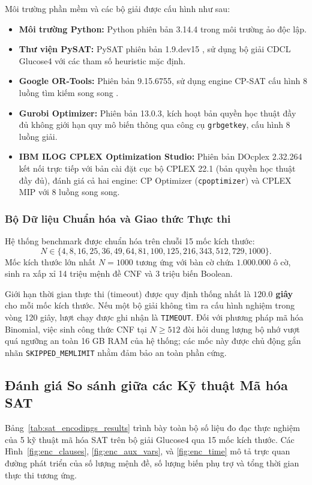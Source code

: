 \documentclass[a4paper,fleqn]{cas-sc}
\begin{document}
Môi trường phần mềm và các bộ giải được cấu hình như sau:
\begin{itemize}
    \item \textbf{Môi trường Python:} Python phiên bản 3.14.4 trong môi trường ảo độc lập.
    \item \textbf{Thư viện PySAT:} PySAT phiên bản 1.9.dev15 \cite{ignatiev2018pysat}, sử dụng bộ giải CDCL Glucose4 \cite{audemard2009predicting} với các tham số heuristic mặc định.
    \item \textbf{Google OR-Tools:} Phiên bản 9.15.6755, sử dụng engine CP-SAT cấu hình 8 luồng tìm kiếm song song \cite{perron2023ortools}.
    \item \textbf{Gurobi Optimizer:} Phiên bản 13.0.3, kích hoạt bản quyền học thuật đầy đủ không giới hạn quy mô biến thông qua công cụ \texttt{grbgetkey}, cấu hình 8 luồng giải.
    \item \textbf{IBM ILOG CPLEX Optimization Studio:} Phiên bản DOcplex 2.32.264 kết nối trực tiếp với bản cài đặt cục bộ CPLEX 22.1 (bản quyền học thuật đầy đủ), đánh giá cả hai engine: CP Optimizer (\texttt{cpoptimizer}) và CPLEX MIP với 8 luồng song song.
\end{itemize}

\subsubsection{Bộ Dữ liệu Chuẩn hóa và Giao thức Thực thi}
Hệ thống benchmark được chuẩn hóa trên chuỗi 15 mốc kích thước:
\[
N \in \{4, 8, 16, 25, 36, 49, 64, 81, 100, 125, 216, 343, 512, 729, 1000\}.
\]
Mốc kích thước lớn nhất $N = 1000$ tương ứng với bàn cờ chứa $1.000.000$ ô cờ, sinh ra xấp xỉ 14 triệu mệnh đề CNF và 3 triệu biến Boolean.

Giới hạn thời gian thực thi (timeout) được quy định thống nhất là \textbf{$120.0$ giây} cho mỗi mốc kích thước. Nếu một bộ giải không tìm ra cấu hình nghiệm trong vòng 120 giây, lượt chạy được ghi nhận là \texttt{TIMEOUT}. Đối với phương pháp mã hóa Binomial, việc sinh công thức CNF tại $N \ge 512$ đòi hỏi dung lượng bộ nhớ vượt quá ngưỡng an toàn 16 GB RAM của hệ thống; các mốc này được chủ động gắn nhãn \texttt{SKIPPED\_MEMLIMIT} nhằm đảm bảo an toàn phần cứng.

\subsection{Đánh giá So sánh giữa các Kỹ thuật Mã hóa SAT}
Bảng~\ref{tab:sat_encodings_results} trình bày toàn bộ số liệu đo đạc thực nghiệm của 5 kỹ thuật mã hóa SAT trên bộ giải Glucose4 qua 15 mốc kích thước. Các Hình~\ref{fig:enc_clauses}, \ref{fig:enc_aux_vars}, và \ref{fig:enc_time} mô tả trực quan đường phát triển của số lượng mệnh đề, số lượng biến phụ trợ và tổng thời gian thực thi tương ứng.
\end{document}
